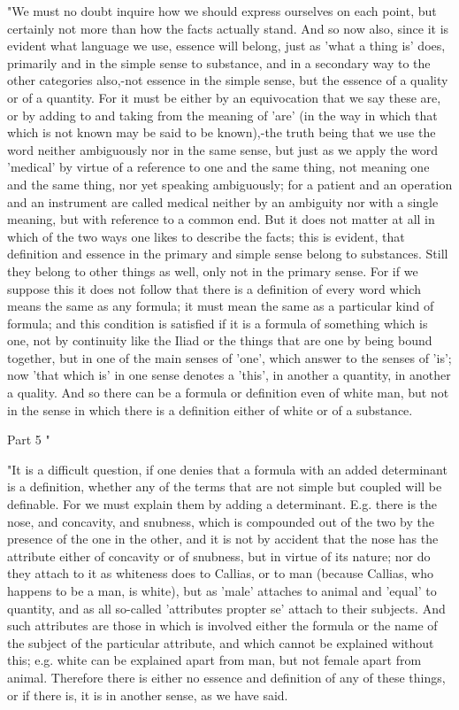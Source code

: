 "We must no doubt inquire how we should express ourselves on each
point, but certainly not more than how the facts actually stand. And
so now also, since it is evident what language we use, essence will
belong, just as 'what a thing is' does, primarily and in the simple
sense to substance, and in a secondary way to the other categories
also,-not essence in the simple sense, but the essence of a quality
or of a quantity. For it must be either by an equivocation that we
say these are, or by adding to and taking from the meaning of 'are'
(in the way in which that which is not known may be said to be known),-the
truth being that we use the word neither ambiguously nor in the same
sense, but just as we apply the word 'medical' by virtue of a reference
to one and the same thing, not meaning one and the same thing, nor
yet speaking ambiguously; for a patient and an operation and an instrument
are called medical neither by an ambiguity nor with a single meaning,
but with reference to a common end. But it does not matter at all
in which of the two ways one likes to describe the facts; this is
evident, that definition and essence in the primary and simple sense
belong to substances. Still they belong to other things as well, only
not in the primary sense. For if we suppose this it does not follow
that there is a definition of every word which means the same as any
formula; it must mean the same as a particular kind of formula; and
this condition is satisfied if it is a formula of something which
is one, not by continuity like the Iliad or the things that are one
by being bound together, but in one of the main senses of 'one', which
answer to the senses of 'is'; now 'that which is' in one sense denotes
a 'this', in another a quantity, in another a quality. And so there
can be a formula or definition even of white man, but not in the sense
in which there is a definition either of white or of a substance.

Part 5 "

"It is a difficult question, if one denies that a formula with an
added determinant is a definition, whether any of the terms that are
not simple but coupled will be definable. For we must explain them
by adding a determinant. E.g. there is the nose, and concavity, and
snubness, which is compounded out of the two by the presence of the
one in the other, and it is not by accident that the nose has the
attribute either of concavity or of snubness, but in virtue of its
nature; nor do they attach to it as whiteness does to Callias, or
to man (because Callias, who happens to be a man, is white), but as
'male' attaches to animal and 'equal' to quantity, and as all so-called
'attributes propter se' attach to their subjects. And such attributes
are those in which is involved either the formula or the name of the
subject of the particular attribute, and which cannot be explained
without this; e.g. white can be explained apart from man, but not
female apart from animal. Therefore there is either no essence and
definition of any of these things, or if there is, it is in another
sense, as we have said. 

